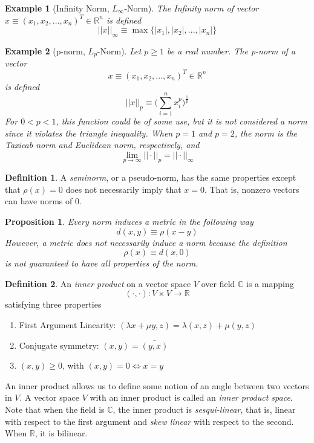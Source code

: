 \documentclass{article}
\newtheorem{proposition}[theorem]{Proposition}
\newtheorem{example}{Example}[section]
\theoremstyle{remark}
\theoremstyle{definition}
\newtheorem{definition}{Definition}[section]
\begin{document}
  \begin{example}[Infinity Norm, $L_\infty$-Norm]
  The Infinity norm of vector $x \equiv (x_1, x_2, ..., x_n)^T \in \mathbb{R}^n$ is defined
  \[ ||x||_\infty \equiv \max{\{|x_1|, |x_2|, ..., |x_n|\}}\]
  \end{example}

  \begin{example}[p-norm, $L_p$-Norm]
  Let $p\geq 1$ be a real number. The p-norm of a vector 
    \[x \equiv (x_1, x_2, ..., x_n)^T \in \mathbb{R}^n\]
  is defined
    \[ ||x||_p \equiv \bigg( \sum_{i=1}^n x_i^p \bigg)^{\frac{1}{p}}\]
  For $0<p<1$, this function could be of some use, but it is not considered a norm since it violates the triangle inequality. When $p = 1$ and $p =2$, the norm is the Taxicab norm and Euclidean norm, respectively, and 
  \[ \lim_{p \rightarrow \infty} ||\cdot||_p = ||\cdot||_\infty\]
  \end{example}

  \begin{definition}
  A \textit{seminorm}, or a pseudo-norm, has the same properties except that $\rho(x) = 0$ does not necessarily imply that $x = 0$. That is, nonzero vectors can have norms of $0$. 
  \end{definition}

  \begin{proposition}
  Every norm induces a metric in the following way
  \[ d(x, y) \equiv \rho(x-y)\]
  However, a metric does not necessarily induce a norm because the definition
  \[\rho(x) \equiv d(x, 0)\]
  is not guaranteed to have all properties of the norm. 
  \end{proposition}

  \begin{definition}
  An \textit{inner product} on a vector space $V$ over field $\mathbb{C}$ is a mapping 
  \[(\cdot, \cdot): V \times V \longrightarrow \mathbb{R}\]
  satisfying three properties 
  \begin{enumerate}
      \item First Argument Linearity: $(\lambda x + \mu y, z) = \lambda (x, z) + \mu (y, z)$
      \item Conjugate symmetry: $(x, y) = \bar{(y, x)}$
      \item $(x, y) \geq 0$, with $(x, y) = 0 \iff x = y$
  \end{enumerate}
  An inner product allows us to define some notion of an angle between two vectors in $V$. A vector space $V$ with an inner product is called an \textit{inner product space}. Note that when the field is $\mathbb{C}$, the inner product is \textit{sesqui-linear}, that is, linear with respect to the first argument and \textit{skew linear} with respect to the second. When $\mathbb{R}$, it is bilinear. 
  \end{definition}
\end{document}
